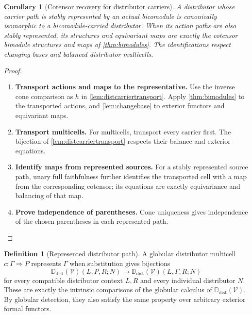 \documentclass[11pt,reqno]{amsart}
\theoremstyle{plain}
\newtheorem{corollary}[theorem]{Corollary}
\theoremstyle{definition}
\newtheorem{definition}[theorem]{Definition}
\theoremstyle{remark}
\numberwithin{equation}{section}
\newcommand{\V}{\mathcal V}
\newcommand{\Ddist}{\mathbb D_{\mathrm{dist}}}
\newcommand{\cell}{\mathrel{\Longrightarrow}}
\begin{document}
\begin{corollary}[Cotensor recovery for distributor carriers]\label{cor:distcotensor}
A distributor whose carrier path is stably represented by an actual
bicomodule is canonically isomorphic to a bicomodule-carried distributor.
When its action paths are also stably represented, its structures and
equivariant maps are exactly the cotensor bimodule structures and maps
of \cref{thm:bimodules}. The identifications respect changing bases and
balanced distributor multicells.
\end{corollary}
\begin{proof}\leavevmode
\begin{enumerate}
\item \textbf{Transport actions and maps to the representative.} Use the inverse cone comparison as $h$ in
\cref{lem:distcarriertransport}. Apply \cref{thm:bimodules} to the
transported actions, and \cref{lem:changebase} to exterior functors
and equivariant maps.

\item \textbf{Transport multicells.} For multicells, transport every carrier first.
The bijection of \cref{lem:distcarriertransport} respects their balance
and exterior equations.

\item \textbf{Identify maps from represented sources.} For a stably represented source path, unary full
faithfulness further identifies the transported cell with a map from the
corresponding cotensor; its equations are exactly equivariance and
balancing of that map.

\item \textbf{Prove independence of parentheses.} Cone uniqueness gives independence of the chosen
parentheses in each represented path.\qedhere
\end{enumerate}
\end{proof}

\begin{definition}[Represented distributor path]\label{def:representeddist}
A globular distributor multicell $c:\Gamma\cell P$ represents
$\Gamma$ when substitution gives bijections
\begin{equation}\label{eq:distuniversal}
 \Ddist(\V)(L,P,R;N)
 \longrightarrow\Ddist(\V)(L,\Gamma,R;N)
\end{equation}
for every compatible distributor context $L,R$ and every individual
distributor $N$. These are exactly the intrinsic comparisons of the
globular calculus of $\Ddist(\V)$. By globular detection, they also
satisfy the same property over arbitrary exterior formal functors.
\end{definition}
\end{document}
